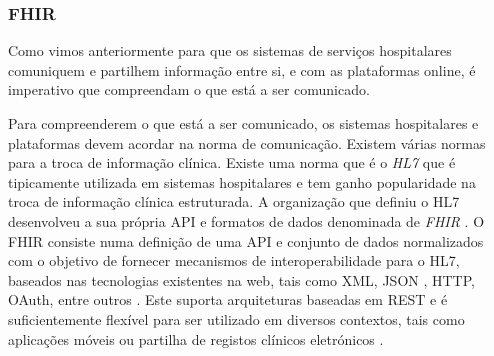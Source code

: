 \subsubsection{FHIR}
Como vimos anteriormente para que os sistemas de serviços hospitalares comuniquem e partilhem  informação entre si, e com as plataformas online, é imperativo que compreendam o que está a ser comunicado.
\par 
Para compreenderem o que está a ser comunicado, os sistemas hospitalares e plataformas devem acordar na norma de comunicação. Existem várias normas para a troca de informação clínica. Existe uma norma que é o \textit{\gls{HL7}} que é tipicamente utilizada em sistemas hospitalares \cite{whyihe} e tem ganho popularidade na troca de informação clínica estruturada.
A organização que definiu o \gls{HL7} desenvolveu a sua própria \gls{API} e formatos de dados denominada de \textit{\gls{FHIR}} \cite{hl7fhir}. O \gls{FHIR} consiste numa definição de uma \gls{API} e conjunto de dados normalizados com o objetivo de fornecer mecanismos de interoperabilidade para o \gls{HL7}, baseados nas tecnologias existentes na web, tais como \gls{XML}, \gls{JSON} , \gls{HTTP}, OAuth, entre outros \cite{hl7fhir}. Este suporta arquiteturas baseadas em \gls{REST} e é suficientemente flexível para ser utilizado em diversos contextos, tais como aplicações móveis ou partilha de registos clínicos eletrónicos \cite{hl7fhir}.

